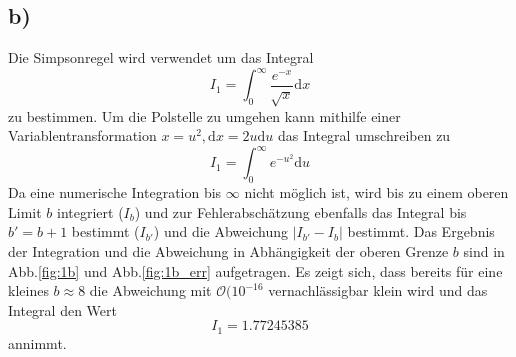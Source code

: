 \subsection*{b)}
Die Simpsonregel wird verwendet um das Integral
\[
I_1 = \int_0^{\infty} \frac{e^{-x}}{\sqrt{x}} \mathrm{d}x
\]
zu bestimmen. Um die Polstelle zu umgehen kann mithilfe einer Variablentransformation $x=u^2, \mathrm{d}x=2u\mathrm{d}u$
das Integral umschreiben zu 
\[
I_1 = \int_0^{\infty} e^{-u^2} \mathrm{d}u
\]
Da eine numerische Integration bis $\infty$ nicht möglich ist, wird bis zu einem oberen Limit $b$ integriert ($I_b$) und zur Fehlerabschätzung ebenfalls das Integral bis $b' = b+1$ bestimmt ($I_{b'}$) und die Abweichung $|I_{b'}-I_b|$ bestimmt. Das Ergebnis der Integration und die Abweichung in Abhängigkeit der oberen Grenze $b$ sind in Abb.\ref{fig:1b} und Abb.\ref{fig:1b_err} aufgetragen.
Es zeigt sich, dass bereits für eine kleines $b\approx 8$ die Abweichung mit $\mathcal{O}(10^{-16}$ vernachlässigbar klein wird und das Integral den Wert
\[
I_1 = 1.77245385
\]
annimmt.
